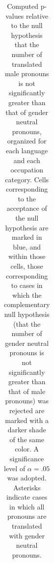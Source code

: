 \documentclass[twoside,11pt]{article}
\begin{document}
\begin{table}[H]
\begin{tabular}{|m{1.75cm}|cccccccccccc|c|}
\end{tabular}
\caption{Computed p-values relative to the null hypothesis that the number of translated male pronouns is not significantly greater than that of gender neutral pronouns, organized for each language and each occupation category. Cells corresponding to the acceptance of the null hypothesis are marked in blue, and within those cells, those corresponding to cases in which the complementary null hypothesis (that the number of gender neutral pronouns is not significantly greater than that of male pronouns) was rejected are marked with a darker shade of the same color. A significance level of $\alpha =.05$ was adopted. Asterisks indicate cases in which all pronouns are translated with gender neutral pronouns.}
\label{tab:pvalues-MN}
\end{table}
\end{document}

